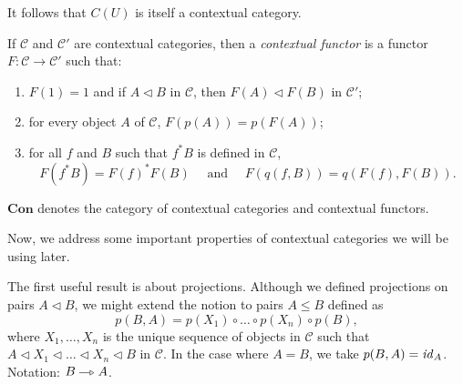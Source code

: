 It follows that $C(U)$ is itself a contextual category.

\begin{definition}
    If $\mathcal{C}$ and $\mathcal{C}'$ are contextual categories, then a \textit{contextual functor}
    is a functor $F \colon \mathcal{C} \to \mathcal{C}'$ such that:
    \begin{enumerate}
        \item $F(1) = 1$ and if $A \lhd B$ in $\mathcal{C}$, then $F(A) \lhd F(B)$ in $\mathcal{C}'$;
        \item for every object $A$ of $\mathcal{C}$, $F(p(A)) = p(F(A))$;
        \item for all $f$ and $B$ such that $f^*B$ is defined in $\mathcal{C}$,
            \[
                F(f^*B) = F(f)^*F(B) 
                    \quad \text{ and } \quad 
                F(q(f, B)) = q(F(f), F(B)).
            \]
    \end{enumerate}
\end{definition}
$\mathbf{Con}$ denotes the category of contextual categories and contextual functors.

Now, we address some important properties of contextual categories we will be using later.

The first useful result is about projections. Although we defined projections on pairs $A \lhd B$, 
we might extend the notion to pairs $A \leq B$ defined as \[
    p(B, A) = p(X_1) \circ \dots \circ p(X_n) \circ p(B),
\] where $X_1, \dots, X_n$ is the unique sequence of objects in $\mathcal{C}$ such that
$A \lhd X_1 \lhd \dots \lhd X_n \lhd B$ in $\mathcal{C}$. 
In the case where $A = B$, we take $p(B, A) = \operatorname{\mathit{id}}_A$.
Notation: $B \openrightarrow A$. %

